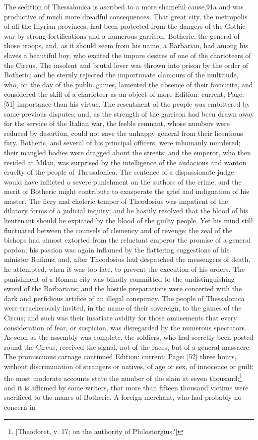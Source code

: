 The sedition of Thessalonica is ascribed to a more shameful cause,91a and was productive of much more dreadful consequences. That great city, the metropolis of all the Illyrian provinces, had been protected from the dangers of the Gothic war by strong fortifications and a numerous garrison. Botheric, the general of those troops, and, as it should seem from his name, a Barbarian, had among his slaves a beautiful boy, who excited the impure desires of one of the charioteers of the Circus. The insolent and brutal lover was thrown into prison by the order of Botheric; and he sternly rejected the importunate clamours of the multitude, who, on the day of the public games, lamented the absence of their favourite, and considered the skill of a charioteer as an object of more Edition: current; Page: [51] importance than his virtue. The resentment of the people was embittered by some previous disputes; and, as the strength of the garrison had been drawn away for the service of the Italian war, the feeble remnant, whose numbers were reduced by desertion, could not save the unhappy general from their licentious fury. Botheric, and several of his principal officers, were inhumanly murdered; their mangled bodies were dragged about the streets; and the emperor, who then resided at Milan, was surprised by the intelligence of the audacious and wanton cruelty of the people of Thessalonica. The sentence of a dispassionate judge would have inflicted a severe punishment on the authors of the crime; and the merit of Botheric might contribute to exasperate the grief and indignation of his master. The fiery and choleric temper of Theodosius was impatient of the dilatory forms of a judicial inquiry; and he hastily resolved that the blood of his lieutenant should be expiated by the blood of the guilty people. Yet his mind still fluctuated between the counsels of clemency and of revenge; the zeal of the bishops had almost extorted from the reluctant emperor the promise of a general pardon; his passion was again inflamed by the flattering suggestions of his minister Rufinus; and, after Theodosius had despatched the messengers of death, he attempted, when it was too late, to prevent the execution of his orders. The punishment of a Roman city was blindly committed to the undistinguishing sword of the Barbarians; and the hostile preparations were concerted with the dark and perfidious artifice of an illegal conspiracy. The people of Thessalonica were treacherously invited, in the name of their sovereign, to the games of the Circus; and such was their insatiate avidity for those amusements that every consideration of fear, or suspicion, was disregarded by the numerous spectators. As soon as the assembly was complete, the soldiers, who had secretly been posted round the Circus, received the signal, not of the races, but of a general massacre. The promiscuous carnage continued Edition: current; Page: [52] three hours, without discrimination of strangers or natives, of age or sex, of innocence or guilt; the most moderate accounts state the number of the slain at seven thousand;\footnote{[Theodoret, v. 17; on the authority of Philostorgius?]} and it is affirmed by some writers, that more than fifteen thousand victims were sacrificed to the manes of Botheric. A foreign merchant, who had probably no concern in 